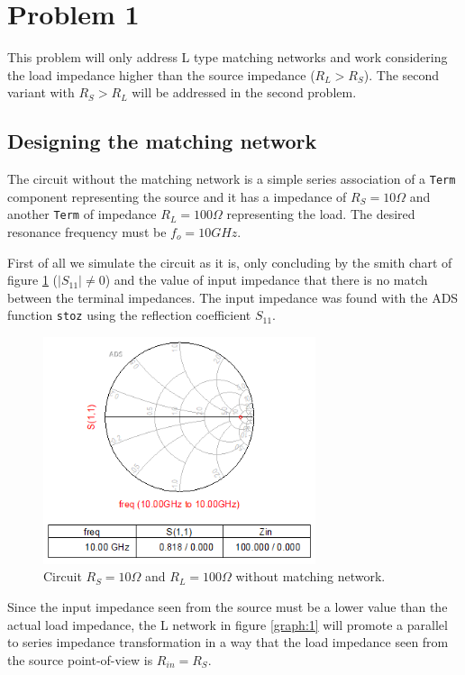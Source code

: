 \section{Problem 1}

This problem will only address L type matching networks and work considering the load impedance higher than the source impedance ($R_L>R_S$). The second variant with $R_S>R_L$ will be addressed in the second problem.

\subsection{Designing the matching network}

The circuit without the matching network is a simple series association of a \texttt{Term} component representing the source and it has a impedance of $R_S=10 \Omega$ and another \texttt{Term} of impedance $R_L=100 \Omega$ representing the load. The desired resonance frequency must be $f_o = 10 GHz$.

First of all we simulate the circuit as it is, only concluding by the smith chart of figure \ref{fig:smith1} ($|S_{11}| \neq 0$) and the value of input impedance that there is no match between the terminal impedances. The input impedance was found with the ADS function \texttt{stoz} using the reflection coefficient $S_{11}$.

\begin{figure}[H] 
\centering
\includegraphics[width=8cm]{images/smith1.PNG}
\caption{Circuit $R_S=10 \Omega$ and $R_L=100 \Omega$ without matching network.}
\label{fig:smith1} 
\end{figure}

Since the input impedance seen from the source must be a lower value than the actual load impedance, the L network in figure \ref{graph:1} will promote a parallel to series impedance transformation in a way that the load impedance seen from the source point-of-view is $R_{in} = R_S$.

